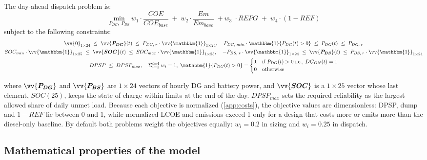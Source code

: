 \documentclass[final,3p,times]{elsarticle}
\begin{document}
The day-ahead dispatch problem is:
\begin{equation}
    \label{eq:dispatch}
    \min_{P_{DG}, \; P_{BS}} w_1 \cdot \frac{COE}{COE_{base}} \; + \; w_2 \cdot \frac{Em}{Em_{base}} \; + w_3 \; \cdot REPG \; + \; w_4 \cdot (1-REF)
\end{equation}
subject to the following constraints:
\begin{gather*}
\vv{0}_{1\times24} \; \leq \; \vv{\bm{P_{DG}}}(t) \; \leq \; P_{DG,\;r}\cdot \vv{\mathbbm{1}}_{1\times24}, \quad P_{DG,\;min} \cdot \mathbbm{1}\{P_{DG}(t) > 0\} \; \leq \; P_{DG}(t) \; \leq \; P_{DG,\;r} \\
SOC_{min}\cdot \vv{\mathbbm{1}}_{1\times25} \; \leq \;\vv{\bm{SOC}}(t) \;\leq\; SOC_{max}\cdot \vv{\mathbbm{1}}_{1\times25}, \quad -P_{BS,\;r}\cdot \vv{\mathbbm{1}}_{1\times24} \;\leq \;\vv{\bm{P_{BS}}}(t) \; \leq \; P_{BS,\;r}\cdot \vv{\mathbbm{1}}_{1\times24} \\
DPSP \; \leq \;DPSP_{max}, \quad \Sigma_{i=1}^{i=4} \; w_i  = 1, \; \mathbbm{1}\{P_{DG}(t) > 0\} = 
\begin{cases} 
    1 & \text{if } P_{DG}(t) > 0 \; \text{i.e., } DG_{ON}(t) = 1\\
    0 & \text{otherwise}
\end{cases} 
\end{gather*}

where $\vv{\bm{P_{DG}}}$ and $\vv{\bm{P_{BS}}}$ are $1\times24$ vectors of hourly DG and battery power, and $\vv{\bm{SOC}}$ is a $1\times25$ vector whose last element, $SOC(25)$, keeps the state of charge within limits at the end of the day. $DPSP_{max}$ sets the required reliability as the largest allowed share of daily unmet load. Because each objective is normalized (\cref{app:costs}), the objective values are dimensionless: DPSP, dump and $1-REF$ lie between 0 and 1, while normalized LCOE and emissions exceed 1 only for a design that costs more or emits more than the diesel-only baseline. By default both problems weight the objectives equally: $w_i = 0.2$ in sizing and $w_i = 0.25$ in dispatch.

\subsection{Mathematical properties of the model}
\end{document}
